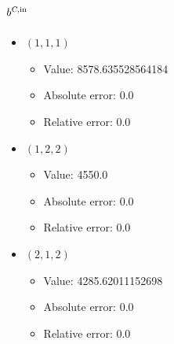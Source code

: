 \documentclass{article}%
\begin{document}
\subsection{$b^{\textsl{C},\text{in}}$}%
\begin{itemize}%
	\item $(1, 1, 1)$%
	\begin{itemize}%
		\item Value: 8578.635528564184%
		\item Absolute error: 0.0%
		\item Relative error: 0.0%
	\end{itemize}%
	\item $(1, 2, 2)$%
	\begin{itemize}%
		\item Value: 4550.0%
		\item Absolute error: 0.0%
		\item Relative error: 0.0%
	\end{itemize}%
	\item $(2, 1, 2)$%
	\begin{itemize}%
		\item Value: 4285.62011152698%
		\item Absolute error: 0.0%
		\item Relative error: 0.0%
	\end{itemize}%
\end{itemize}%
\end{document}
